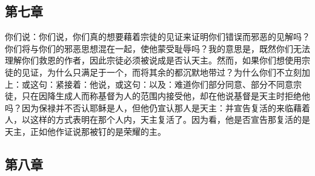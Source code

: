 
\subsection{第七章}

\par

你们说：你们说，你们真的想要藉着宗徒的见证来证明你们错误而邪恶的见解吗？你们将与你们的邪恶思想混在一起，使他蒙受耻辱吗？我的意思是，既然你们无法理解你们救恩的作者，因此宗徒必须被说成是否认天主。然而，如果你们想使用宗徒的见证，为什么只满足于一个，而将其余的都沉默地带过？为什么你们不立刻加上：或这句：紧接着：他说，或这句：以及：难道你们部分同意、部分不同意宗徒，只在因降生成人而称基督为人的范围内接受他，却在他说基督是天主时拒绝他吗？因为保禄并不否认耶稣是人，但他仍宣认那人是天主：并宣告复活的来临藉着人，以这样的方式表明在那个人内，天主复活了。因为看，他是否宣告那复活的是天主，正如他作证说那被钉的是荣耀的主。\par


\subsection{第八章}

\par

